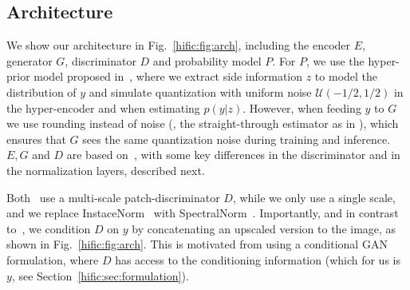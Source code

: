 \subsection{Architecture} \label{hific:sec:arch}

We show our architecture in Fig.~\ref{hific:fig:arch}, including the encoder $E$, generator $G$, discriminator $D$ and probability model $P$.
For $P$, we use the hyper-prior model proposed in~\cite{balle2018variational}, where we extract side information $z$ to model the distribution of $y$ and simulate  quantization with uniform noise $\mathcal{U}(-1/2, 1/2)$ in the hyper-encoder and when estimating $p(y|z)$.
However, when feeding $y$ to $G$ we use rounding instead of noise (\ie, the straight-through estimator as in \cite{theis2017lossy}), which ensures that $G$ sees the same quantization noise during training and inference.
$E, G$ and $D$ are based on~\cite{wang2018highres,agustsson2019extreme}, with some key differences in the discriminator and in the normalization layers, described next.

Both~\cite{wang2018highres,agustsson2019extreme} use a multi-scale patch-discriminator $D$, while we only use a single scale, and we replace InstaceNorm~\cite{ulyanov2016instance} with SpectralNorm~\cite{miyato2018spectral}. Importantly, and in contrast to~\cite{agustsson2019extreme}, we condition $D$ on $y$ by concatenating an upscaled version to the image, as shown in Fig.~\ref{hific:fig:arch}. This is motivated from using a conditional GAN formulation, where $D$ has access to the conditioning information (which for us is $y$, see Section~\ref{hific:sec:formulation}).

